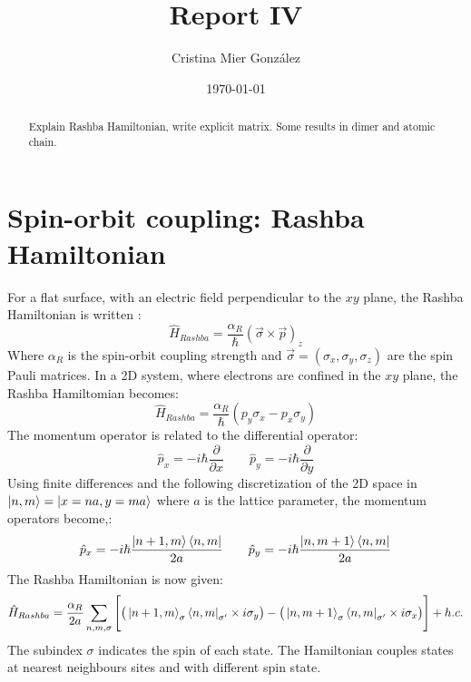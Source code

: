 \documentclass[letterpaper,12pt]{article}
\begin{document}
\title{Report IV}
\author{Cristina Mier Gonz\'alez}
\date{\today}
\maketitle

\begin{abstract}
Explain Rashba Hamiltonian, write explicit matrix. Some results in dimer and atomic chain.
\end{abstract}

\section{Spin-orbit coupling: Rashba Hamiltonian}
For a flat surface, with an electric field perpendicular to the $xy$ plane, the Rashba Hamiltonian is written \cite{Manchon2015}:
\begin{equation}
    \hat{H}_{Rashba} = \frac{\alpha_R}{\hbar}(\Vec{\sigma}\times\Vec{p})_z
\end{equation}
Where $\alpha_R$ is the spin-orbit coupling strength and $\Vec{\sigma} = (\sigma_x, \sigma_y, \sigma_z)$ are the spin Pauli matrices. In a 2D system, where electrons are confined in the $xy$ plane, the Rashba Hamiltomian becomes:
\begin{equation}
    \hat{H}_{Rashba} = \frac{\alpha_R}{\hbar}(p_y\sigma_x - p_x\sigma_y)
    \label{2D}
\end{equation}
The momentum operator is related to the differential operator:
\begin{equation}
    \hat{p}_x = -i\hbar\frac{\partial}{\partial x} \qquad \hat{p}_y = -i\hbar\frac{\partial}{\partial y}
\end{equation}
Using finite differences and the following discretization of the 2D space in $\ket{n, m} = \ket{x = na, y = ma}$ where $a$ is the lattice parameter, the momentum operators become,\cite{thesis}:
\begin{equation}
    \hat{p}_x = -i\hbar \frac{\ket{n+1, m}\bra{n, m}}{2a} \qquad  \hat{p}_y = -i\hbar \frac{\ket{n, m+1}\bra{n, m}}{2a}
\end{equation}
The Rashba Hamiltonian is now given:
\begin{equation}
    \hat{H}_{Rashba} = \frac{\alpha_R}{2a}\sum_{n, m, \sigma}\Bigg[ \big(\ket{n+1, m}_\sigma\bra{n, m}_{\sigma'}\times i\sigma_y\big) - \big(\ket{n, m+1}_{\sigma}\bra{n, m}_{\sigma'}\times i\sigma_x \big)\Bigg] + h.c.
     \label{tight}
\end{equation}
The subindex $\sigma$ indicates the spin of each state. The Hamiltonian couples states at nearest neighbours sites and with different spin state. \\ \\
\end{document}
